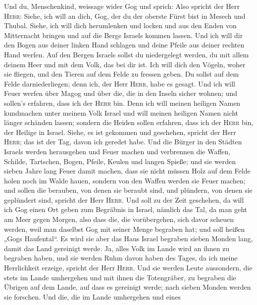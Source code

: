  Und du, Menschenkind, weissage wider Gog und sprich: Also
spricht der Herr \textsc{Herr}: Siehe, ich will an dich, Gog, der du der
oberste Fürst bist in Mesech und Thubal.  Siehe, ich will
dich herumlenken und locken und aus den Enden von Mitternacht bringen
und auf die Berge Israels kommen lassen.  Und ich will dir
den Bogen aus deiner linken Hand schlagen und deine Pfeile aus deiner
rechten Hand werfen.  Auf den Bergen Israels sollst du
niedergelegt werden, du mit allem deinem Heer und mit dem Volk, das bei
dir ist. Ich will dich den Vögeln, woher sie fliegen, und den Tieren auf
dem Felde zu fressen geben.  Du sollst auf dem Felde
darniederliegen; denn ich, der Herr \textsc{Herr}, habe es gesagt.
 Und ich will Feuer werfen über Magog und über die, die in
den Inseln sicher wohnen; und sollen's erfahren, dass ich der
\textsc{Herr} bin.  Denn ich will meinen heiligen Namen
kundmachen unter meinem Volk Israel und will meinen heiligen Namen nicht
länger schänden lassen; sondern die Heiden sollen erfahren, dass ich der
\textsc{Herr} bin, der Heilige in Israel.  Siehe, es ist
gekommen und geschehen, spricht der Herr \textsc{Herr}; das ist der Tag,
davon ich geredet habe.  Und die Bürger in den Städten
Israels werden herausgehen und Feuer machen und verbrennen die Waffen,
Schilde, Tartschen, Bogen, Pfeile, Keulen und langen Spieße; und sie
werden sieben Jahre lang Feuer damit machen,  dass sie
nicht müssen Holz auf dem Felde holen noch im Walde hauen, sondern von
den Waffen werden sie Feuer machen; und sollen die berauben, von denen
sie beraubt sind, und plündern, von denen sie geplündert sind, spricht
der Herr \textsc{Herr}.  Und soll zu der Zeit geschehen,
da will ich Gog einen Ort geben zum Begräbnis in Israel, nämlich das
Tal, da man geht am Meer gegen Morgen, also dass die, die vorübergehen,
sich davor scheuen werden, weil man daselbst Gog mit seiner Menge
begraben hat; und soll heißen „Gogs Haufental``.  Es wird
sie aber das Haus Israel begraben sieben Monden lang, damit das Land
gereinigt werde.  Ja, alles Volk im Lande wird an ihnen
zu begraben haben, und sie werden Ruhm davon haben des Tages, da ich
meine Herrlichkeit erzeige, spricht der Herr \textsc{Herr}.
 Und sie werden Leute aussondern, die stets im Lande
umhergehen und mit ihnen die Totengräber, zu begraben die Übrigen auf
dem Lande, auf dass es gereinigt werde; nach sieben Monden werden sie
forschen.  Und die, die im Lande umhergehen und eines
